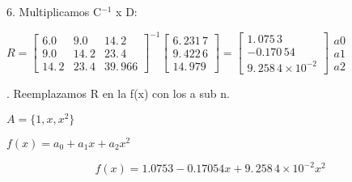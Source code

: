 \documentclass{article}
\begin{document}
\bigskip

6. Multiplicamos C$^{-1}$ x D:

\bigskip $R=\left[ 
\begin{array}{ccc}
6.0 & 9.0 & 14.\,\allowbreak 2 \\ 
9.0 & 14.\,\allowbreak 2 & 23.\,\allowbreak 4 \\ 
14.\,\allowbreak 2 & 23.\,\allowbreak 4 & 39.\,\allowbreak 966%
\end{array}%
\right] ^{-1}\left[ 
\begin{array}{c}
6.\,\allowbreak 231\,7 \\ 
9.\,\allowbreak 422\,6 \\ 
14.\,\allowbreak 979%
\end{array}%
\right] =\allowbreak \left[ 
\begin{array}{c}
1.\,\allowbreak 075\,3 \\ 
-0.170\,54 \\ 
9.\,\allowbreak 258\,4\times 10^{-2}%
\end{array}%
\right] \allowbreak 
\begin{array}{c}
a0 \\ 
a1 \\ 
a2%
\end{array}%
$

. Reemplazamos R en la f(x) con los a sub n.

$A=\{1,x,x^{2}\}$

$f(x)=a_{0}+a_{1}x+a_{2}x^{2}$

\[
f(x)=1.0753-0.17054x+9.\,\allowbreak 258\,4\times 10^{-2}x^{2} 
\]
\end{document}
